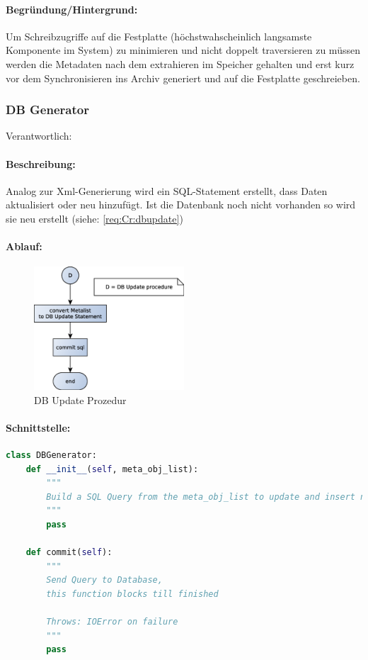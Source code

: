 \paragraph{Begründung/Hintergrund:}
\label{par:begr_ndung_hintergrund_}
Um Schreibzugriffe auf die Festplatte (höchstwahscheinlich langsamste Komponente im System) zu minimieren
und nicht doppelt traversieren zu müssen werden die Metadaten nach dem extrahieren im Speicher gehalten und
erst kurz vor dem Synchronisieren ins Archiv generiert und auf die Festplatte geschreieben. 


\subsubsection{DB Generator}
\label{ssub:dbgen}
Verantwortlich: \ciii 
\paragraph{Beschreibung:}
\label{par:beschreibung_}
Analog zur Xml-Generierung wird ein SQL-Statement erstellt, dass Daten aktualisiert oder neu hinzufügt.
Ist die Datenbank noch nicht vorhanden so wird sie neu erstellt (siehe: \ref{req:Cr:dbupdate})
\paragraph{Ablauf:}
\label{par:ablauf_}
\hfill
\begin{figure}[H]
	\centering
	\includegraphics[width=0.5\textwidth]{design/backend/gfx/dbupdate.eps}
	\caption{DB Update Prozedur}
\end{figure}


\paragraph{Schnittstelle:}
\label{par:schnittstelle_}
\hfill
\begin{lstlisting}[language=python]
class DBGenerator:
    def __init__(self, meta_obj_list):
        """
        Build a SQL Query from the meta_obj_list to update and insert new items the Database 
        """
        pass

    def commit(self):
        """
        Send Query to Database,
        this function blocks till finished

        Throws: IOError on failure
        """
        pass
\end{lstlisting}

